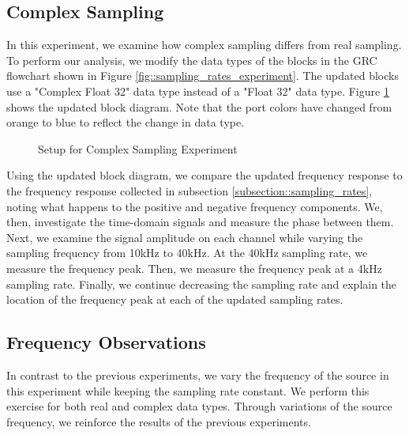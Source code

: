 \documentclass{article}
\begin{document}
\subsection{Complex Sampling \label{subsection::complex_sampling}}

In this experiment, we examine how complex sampling differs from real sampling. To perform our analysis, we modify the data types of the blocks in the GRC flowchart shown in Figure \ref{fig::sampling_rates_experiment}. The updated blocks use a "Complex Float 32" data type instead of a "Float 32" data type. Figure \ref{fig::complex_sampling_experiment} shows the updated block diagram. Note that the port colors have changed from orange to blue to reflect the change in data type.

\begin{figure}[H]
	\centerline{}
	\caption{Setup for Complex Sampling Experiment}
	\label{fig::complex_sampling_experiment}
\end{figure}

Using the updated block diagram, we compare the updated frequency response to the frequency response collected in subsection \ref{subsection::sampling_rates}, noting what happens to the positive and negative frequency components. We, then, investigate the time-domain signals and measure the phase between them. Next, we examine the signal amplitude on each channel while varying the sampling frequency from 10kHz to 40kHz. At the 40kHz sampling rate, we measure the frequency peak. Then, we measure the frequency peak at a 4kHz sampling rate. Finally, we continue decreasing the sampling rate and explain the location of the frequency peak at each of the updated sampling rates.

\subsection{Frequency Observations}

In contrast to the previous experiments, we vary the frequency of the source in this experiment while keeping the sampling rate constant. We perform this exercise for both real and complex data types. Through variations of the source frequency, we reinforce the results of the previous experiments.
\end{document}
